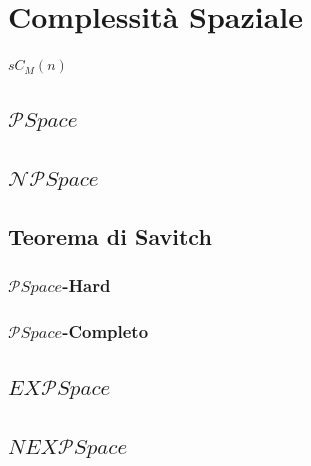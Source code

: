 \documentclass{article}  %
\theoremstyle{definition}
\begin{document}
\section{Complessità Spaziale}
$sC_M(n)$

\break

\subsection{$\mathcal{P}Space$}
\vspace*{0.4\textheight}  %
\subsection{$\mathcal{NP}Space$}
\vspace*{0.5\textheight}  %
\subsection{Teorema di Savitch}
\vspace*{0.4\textheight}  %
\subsubsection{$\mathcal{P}Space$-Hard}
\vspace*{0.2\textheight}  %
\subsubsection{$\mathcal{P}Space$-Completo}
\vspace*{0.2\textheight}  %

\break
\subsection{$EX\mathcal{P}Space$}
\vspace*{0.4\textheight}  %
\subsection{$NEX\mathcal{P}Space$}
\vspace*{0.4\textheight}  %
\end{document}
